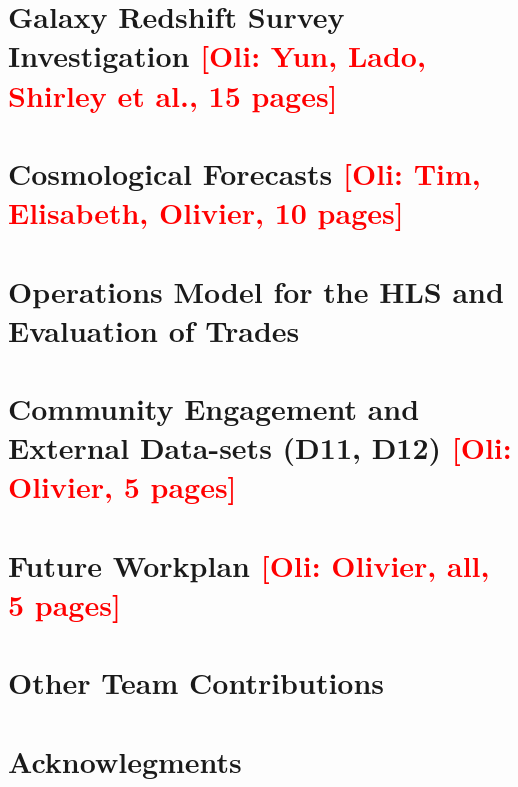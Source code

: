 \documentclass[letter]{ar-1col_WFIRST-HLS}
\newcommand{\Oli}[1]{\textcolor{red}{[{\bf Oli}: #1]}}
\begin{document}
\section{Galaxy Redshift Survey Investigation \Oli{Yun, Lado, Shirley et al., 15 pages}}
\label{sec:gc}


\section{Cosmological Forecasts \Oli{Tim, Elisabeth, Olivier, 10 pages}}
\label{sec:forecast}


\section{Operations Model for the HLS and Evaluation of Trades}
\label{sec:operation}


\section{Community Engagement and External Data-sets (D11, D12) \Oli{Olivier, 5 pages}}
\label{sec:engagement}


\section{Future Workplan \Oli{Olivier, all, 5 pages}}
\label{sec:workplan}


\section{Other Team Contributions}
\label{sec:other_contributions}


\section*{Acknowlegments}
\label{sec:acknowledgments}

\end{document}
